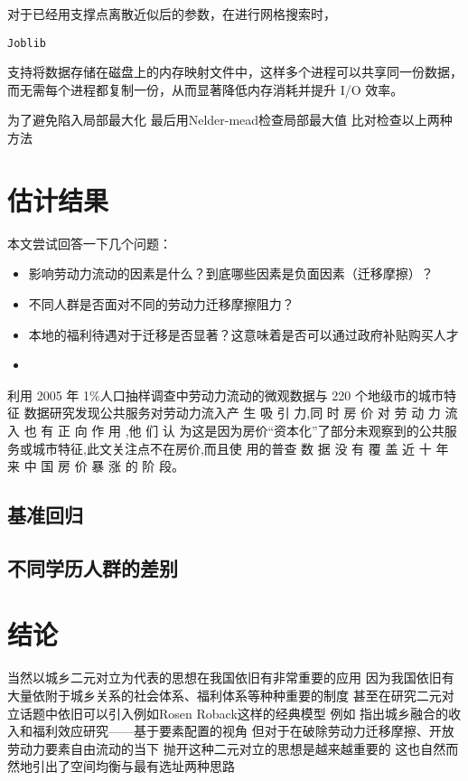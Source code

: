 \documentclass[a4paper,12pt]{article}
\begin{document}
对于已经用支撑点离散近似后的参数，在进行网格搜索时，\begin{verbatim}Joblib\end{verbatim}支持将数据存储在磁盘上的内存映射文件中，这样多个进程可以共享同一份数据，而无需每个进程都复制一份，从而显著降低内存消耗并提升 I/O 效率。

为了避免陷入局部最大化
最后用Nelder-mead检查局部最大值
比对检查以上两种方法

\section{估计结果}

本文尝试回答一下几个问题：
\begin{itemize}
  \item 影响劳动力流动的因素是什么？到底哪些因素是负面因素（迁移摩擦）？
  \item 不同人群是否面对不同的劳动力迁移摩擦阻力？
  \item 本地的福利待遇对于迁移是否显著？这意味着是否可以通过政府补贴购买人才
  \item 
\end{itemize}


\cite{XiaYiRanChengShiJianDeMengMuSanQianGongGongFuWuYingXiangLaoDongLiLiuXiangDeJingYanYanJiu2015} 利用 2005 年 1\%人口抽样调查中劳动力流动的微观数据与 220 个地级市的城市特征 数据研究发现公共服务对劳动力流入产 生 吸 引 力,同 时 房 价 对 劳 动 力 流 入 也 有 正 向 作 用 ,他 们 认 为这是因为房价“资本化”了部分未观察到的公共服务或城市特征,此文关注点不在房价,而且使 用的普查 数 据 没 有 覆 盖 近 十 年 来 中 国 房 价 暴 涨 的 阶 段。

\subsection{基准回归} %
\label{sub:基准回归}



\subsection{不同学历人群的差别} %
\label{sub:不同学历人群的差别}



\section{结论}
当然以城乡二元对立为代表的思想在我国依旧有非常重要的应用 因为我国依旧有大量依附于城乡关系的社会体系、福利体系等种种重要的制度
甚至在研究二元对立话题中依旧可以引入例如Rosen Roback这样的经典模型
例如 
\cite{GuoDongMeiChengXiangRongHeDeShouRuHeFuLiXiaoYingYanJiuJiYuYaoSuPeiZhiDeShiJiao2023}指出城乡融合的收入和福利效应研究——基于要素配置的视角
但对于在破除劳动力迁移摩擦、开放劳动力要素自由流动的当下
抛开这种二元对立的思想是越来越重要的
这也自然而然地引出了空间均衡与最有选址两种思路
\end{document}
